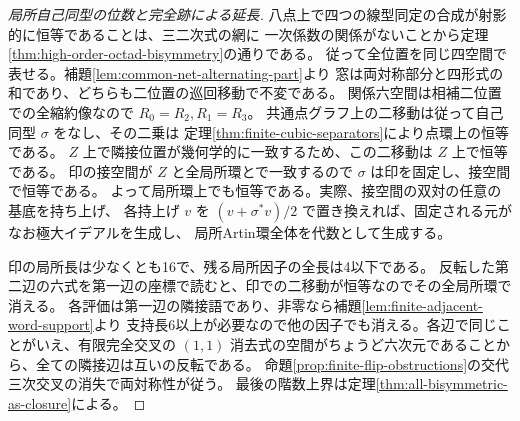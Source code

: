 \begin{proof}[局所自己同型の位数と完全跡による延長]
八点上で四つの線型同定の合成が射影的に恒等であることは、三二次式の網に
一次係数の関係がないことから定理\ref{thm:high-order-octad-bisymmetry}の通りである。
従って全位置を同じ四空間で表せる。補題\ref{lem:common-net-alternating-part}より
窓は両対称部分と四形式の和であり、どちらも二位置の巡回移動で不変である。
関係六空間は相補二位置での全縮約像なので $R_0=R_2,R_1=R_3$。
共通点グラフ上の二移動は従って自己同型 $\sigma$ をなし、その二乗は
定理\ref{thm:finite-cubic-separators}により点環上の恒等である。
$Z$ 上で隣接位置が幾何学的に一致するため、この二移動は $Z$ 上で恒等である。
印の接空間が $Z$ と全局所環とで一致するので $\sigma$ は印を固定し、接空間で恒等である。
よって局所環上でも恒等である。実際、接空間の双対の任意の基底を持ち上げ、
各持上げ $v$ を $(v+\sigma^*v)/2$ で置き換えれば、固定される元がなお極大イデアルを生成し、
局所Artin環全体を代数として生成する。

印の局所長は少なくとも16で、残る局所因子の全長は4以下である。
反転した第二辺の六式を第一辺の座標で読むと、印での二移動が恒等なのでその全局所環で消える。
各評価は第一辺の隣接語であり、非零なら補題\ref{lem:finite-adjacent-word-support}より
支持長6以上が必要なので他の因子でも消える。各辺で同じことがいえ、有限完全交叉の
$(1,1)$ 消去式の空間がちょうど六次元であることから、全ての隣接辺は互いの反転である。
命題\ref{prop:finite-flip-obstructions}の交代三次交叉の消失で両対称性が従う。
最後の階数上界は定理\ref{thm:all-bisymmetric-as-closure}による。
\end{proof}
